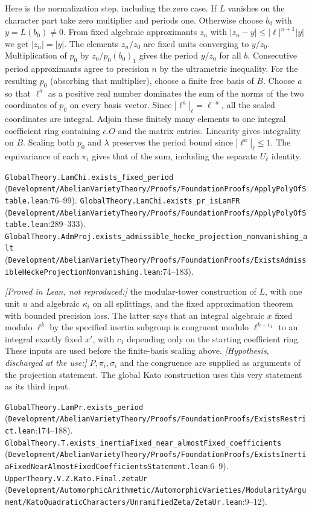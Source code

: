 Here is the normalization step, including the zero case. If $L$ vanishes on the character part take zero multiplier and periods one. Otherwise choose $b_0$ with $y=L(b_0)\ne0$. From fixed algebraic approximants $z_n$ with $|z_n-y|\le |\ell|^{n+1}|y|$ we get $|z_n|=|y|$. The elements $z_n/z_0$ are fixed units converging to $y/z_0$. Multiplication of $p_0$ by $z_0/p_0(b_0)_1$ gives the period $y/z_0$ for all $b$. Consecutive period approximants agree to precision $n$ by the ultrametric inequality. For the resulting $p_0$ (absorbing that multiplier), choose a finite free basis of $B$. Choose $a$ so that $\ell^a$ as a positive real number dominates the sum of the norms of the two coordinates of $p_0$ on every basis vector. Since $|\ell^a|_\ell=\ell^{-a}$, all the scaled coordinates are integral. Adjoin these finitely many elements to one integral coefficient ring containing $c.O$ and the matrix entries. Linearity gives integrality on $B$. Scaling both $p_0$ and $\lambda$ preserves the period bound since $|\ell^a|_\ell\le1$. The equivariance of each $\pi_i$ gives that of the sum, including the separate $U_\ell$ identity.
\par{\footnotesize \nolinkurl{GlobalTheory.LamChi.exists_fixed_period} (\nolinkurl{Development/AbelianVarietyTheory/Proofs/FoundationProofs/ApplyPolyOfStable.lean}\allowbreak:76--99). \nolinkurl{GlobalTheory.LamChi.exists_pr_isLamFR} (\nolinkurl{Development/AbelianVarietyTheory/Proofs/FoundationProofs/ApplyPolyOfStable.lean}\allowbreak:289--333). \nolinkurl{GlobalTheory.AdmProj.exists_admissible_hecke_projection_nonvanishing_alt} (\nolinkurl{Development/AbelianVarietyTheory/Proofs/FoundationProofs/ExistsAdmissibleHeckeProjectionNonvanishing.lean}\allowbreak:74--183).\par}

\textit{[Proved in Lean, not reproduced:]} the modular-tower construction of $L$, with one unit $u$ and algebraic $\kappa_i$ on all splittings, and the fixed approximation theorem with bounded precision loss. The latter says that an integral algebraic $x$ fixed modulo $\ell^k$ by the specified inertia subgroup is congruent modulo $\ell^{k-c_1}$ to an integral exactly fixed $x'$, with $c_1$ depending only on the starting coefficient ring. These inputs are used before the finite-basis scaling above. \textit{[Hypothesis, discharged at the use:]} $P,\pi_i,\sigma_i$ and the congruence are supplied as arguments of the projection statement. The global Kato construction uses this very statement as its third input.
\par{\footnotesize \nolinkurl{GlobalTheory.LamPr.exists_period} (\nolinkurl{Development/AbelianVarietyTheory/Proofs/FoundationProofs/ExistsRestrict.lean}\allowbreak:174--188). \nolinkurl{GlobalTheory.T.exists_inertiaFixed_near_almostFixed_coefficients} (\nolinkurl{Development/AbelianVarietyTheory/Proofs/FoundationProofs/ExistsInertiaFixedNearAlmostFixedCoefficientsStatement.lean}\allowbreak:6--9). \nolinkurl{UpperTheory.V.Z.Kato.Final.zetaUr} (\nolinkurl{Development/AutomorphicArithmetic/AutomorphicVarieties/ModularityArgument/KatoQuadraticCharacters/UnramifiedZeta/ZetaUr.lean}\allowbreak:9--12).\par}

